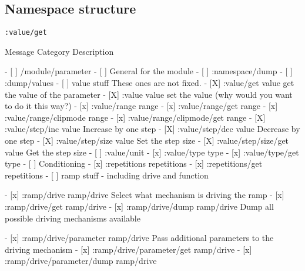 \documentclass{sig-alternate}
\begin{document}
\subsection{Namespace structure}
\texttt{:value/get}


		Message                                               Category       Description

		- [ ] /module/parameter
		    - [ ] General for the module
		        - [ ] :namespace/dump
		        - [ ] :dump/values
		    - [ ] value stuff                                                These ones are not fixed.
		        - [X] :value/get                              value          get the value of the parameter
		        - [X] :value                                  value          set the value (why would you want to do it this way?)
		        - [x] :value/range                            range
		        - [x] :value/range/get                        range
		        - [x] :value/range/clipmode                   range
		        - [x] :value/range/clipmode/get               range
		        - [X] :value/step/inc                         value          Increase by one step
		        - [X] :value/step/dec                         value          Decrease by one step
		        - [X] :value/step/size                        value          Set the step size
		        - [X] :value/step/size/get                    value          Get the step size
		        - [ ] :value/unit
		        - [x] :value/type                             type
		        - [x] :value/type/get                         type
		    - [ ] Conditioning
		        - [x] :repetitions                            repetitions
		        - [x] :repetitions/get                        repetitions
		    - [ ] ramp stuff - including drive and function
		
		        - [x] :ramp/drive                             ramp/drive     Select what mechanism is driving the ramp
		        - [x] :ramp/drive/get                         ramp/drive
		        - [x] :ramp/drive/dump                        ramp/drive	 Dump all possible driving mechanisms available
		
		        - [x] :ramp/drive/parameter                   ramp/drive     Pass additional parameters to the driving mechanism
		        - [x] :ramp/drive/parameter/get               ramp/drive
		        - [x] :ramp/drive/parameter/dump              ramp/drive	
		
\end{document}
